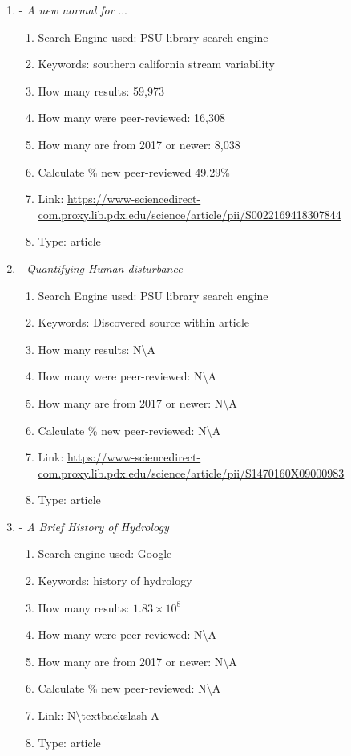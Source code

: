 \documentclass[a4paper,man,biblatex]{apa7}
\begin{document}
\begin{enumerate}
    \item \textcite{mallakpour_2018} - \textit{A new normal for} ... 
        \begin{enumerate}
            \item Search Engine used: PSU library search engine
            \item Keywords: southern california stream variability
            \item How many results: 59,973 
            \item How many were peer-reviewed: 16,308
            \item How many are from 2017 or newer: 8,038
            \item Calculate \% new peer-reviewed 49.29\%
            \item Link: \url{https://www-sciencedirect-com.proxy.lib.pdx.edu/science/article/pii/S0022169418307844}
            \item Type: article 
        \end{enumerate}

    \item \textcite{falcone_2016} - \textit{Quantifying Human disturbance}
        \begin{enumerate}
            \item Search Engine used: PSU library search engine
            \item Keywords: Discovered source within \textcite{rice_2016} article
            \item How many results: N\textbackslash A 
            \item How many were peer-reviewed: N\textbackslash A
            \item How many are from 2017 or newer:  N\textbackslash A
            \item Calculate \% new peer-reviewed: N\textbackslash A
            \item Link: \url{https://www-sciencedirect-com.proxy.lib.pdx.edu/science/article/pii/S1470160X09000983}
            \item Type: article 
        \end{enumerate}

    \item \textcite{bras_1999} - \textit{A  Brief  History  of  Hydrology}
        \begin{enumerate}
            \item Search engine used: Google
            \item Keywords: history of hydrology 
            \item How many results: $1.83\times 10^8$ 
            \item How many were peer-reviewed: N\textbackslash A
            \item How many are from 2017 or newer:  N\textbackslash A
            \item Calculate \% new peer-reviewed: N\textbackslash A
            \item Link: \url{N\textbackslash A}
            \item Type: article 
        \end{enumerate}


\end{enumerate}
\end{document}
